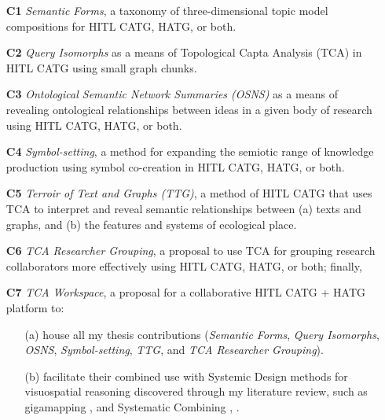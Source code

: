 \begin{enumerate}
    \item[\textbf{C1}] \textit{Semantic Forms}, a taxonomy of three-dimensional topic model compositions for HITL CATG, HATG, or both.
    \item[\textbf{C2}] \textit{Query Isomorphs} as a means of Topological Capta Analysis (TCA) in HITL CATG using small graph chunks.
    \item[\textbf{C3}] \textit{Ontological Semantic Network Summaries (OSNS)} as a means of revealing ontological relationships between ideas in a given body of research using HITL CATG, HATG, or both.
    \item[\textbf{C4}] \textit{Symbol-setting}, a method for expanding the semiotic range of knowledge production using symbol co-creation in HITL CATG, HATG, or both.
    \item[\textbf{C5}] \textit{Terroir of Text and Graphs (TTG)}, a method of HITL CATG that uses TCA to interpret and reveal semantic relationships between (a) texts and graphs, and (b) the features and systems of ecological place.
    \item[\textbf{C6}] \textit{TCA Researcher Grouping}, a proposal to use TCA for grouping research collaborators more effectively using HITL CATG, HATG, or both; finally,
    \item[\textbf{C7}] \textit{TCA Workspace}, a proposal for a collaborative HITL CATG + HATG platform to:
    \begin{enumerate}
        \item[(a)] house all my thesis contributions (\textit{Semantic Forms}, \textit{Query Isomorphs}, \textit{OSNS}, \textit{Symbol-setting}, \textit{TTG}, and \textit{TCA Researcher Grouping}).
        \item[(b)] facilitate their combined use with Systemic Design methods for visuospatial reasoning discovered through my literature review, such as gigamapping \citep{sevaldson_giga-mapping_2011}, \citep[p.~26]{sevaldson_designing_2022} and Systematic Combining \citep[p.~554]{dubois_systematic_2002}, \citep{kjode_entanglement_2024}.
    \end{enumerate}
\end{enumerate}


